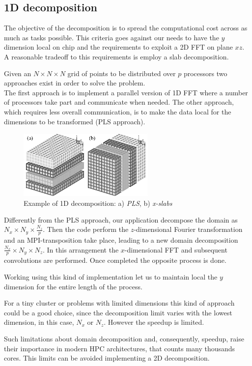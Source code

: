 \subsection{1D decomposition}
The objective of the decomposition is to spread the computational cost across as much as tasks possible. This criteria goes against our needs to have the $y$ dimension local on chip and the requirements to exploit a 2D FFT on plane $xz$.
A reasonable tradeoff to this requirements is employ a slab decomposition. 
\par
Given an $N\times N\times N$ grid of points to be distributed over $p$ processors two approaches exist in order to solve the problem.\\
The first approach is to implement a parallel version of 1D FFT where a number of processors take part and communicate when needed. The other approach, which requires less overall communication, is to make the data local for the dimensions to be transformed (PLS approach\cite{cpl:presentazione}). \\
\begin{figure}
\begin{center}
\includegraphics[width=0.6\textwidth]{grafici/1d_decomp}
\caption{Example of 1D decomposition: a) \emph{PLS},  b) \emph{x-slabs}}
\label{1d:decomp}
\end{center}
\end{figure}
\par
Differently from the PLS approach, our application decompose the domain as $N_{x}\times N_{y}\times \frac{N_{z}}{p}$. Then the code perform the $z$-dimensional Fourier transformation and an MPI-transposition take place, leading to a new domain decomposition $\frac{N_{x}}{p} \times N_{y}\times N_{z}$. In this arrangement the $x$-dimensional FFT and subsequent convolutions are performed. Once completed the opposite process is done. 
\par
Working using this kind of implementation let us to maintain local the $y$ dimension for the entire length of the process. 
\par
For a tiny cluster or problems with limited dimensions this kind of approach could be a good choice, since the decomposition limit varies with the lowest dimension, in this case, $N_{x}$ or $N_{z}$. However the speedup is limited. 
\par
Such limitations about domain decomposition and, consequently, speedup, raise their importance in modern HPC architectures, that counts many thousands cores.  
This limits can be avoided implementing a 2D decomposition.





